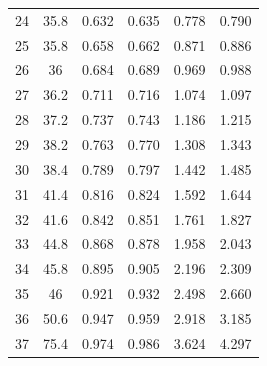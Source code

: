 \begin{table}[H]
\begin{tabular}{cccccc}
    24         & 35.8                      & 0.632                      & 0.635                       & 0.778                   & 0.790                   \\
    25         & 35.8                      & 0.658                      & 0.662                       & 0.871                   & 0.886                   \\
    26         & 36                        & 0.684                      & 0.689                       & 0.969                   & 0.988                   \\
    27         & 36.2                      & 0.711                      & 0.716                       & 1.074                   & 1.097                   \\
    28         & 37.2                      & 0.737                      & 0.743                       & 1.186                   & 1.215                   \\
    29         & 38.2                      & 0.763                      & 0.770                       & 1.308                   & 1.343                   \\
    30         & 38.4                      & 0.789                      & 0.797                       & 1.442                   & 1.485                   \\
    31         & 41.4                      & 0.816                      & 0.824                       & 1.592                   & 1.644                   \\
    32         & 41.6                      & 0.842                      & 0.851                       & 1.761                   & 1.827                   \\
    33         & 44.8                      & 0.868                      & 0.878                       & 1.958                   & 2.043                   \\
    34         & 45.8                      & 0.895                      & 0.905                       & 2.196                   & 2.309                   \\
    35         & 46                        & 0.921                      & 0.932                       & 2.498                   & 2.660                   \\
    36         & 50.6                      & 0.947                      & 0.959                       & 2.918                   & 3.185                   \\
    37         & 75.4                      & 0.974                      & 0.986                       & 3.624                   & 4.297              \\
    \bottomrule    
    \end{tabular}
    \end{table}

